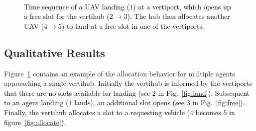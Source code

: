 \begin{figure}[h]
\centering
    ~
    ~
    \caption{\textcolor{black}{Time sequence of a UAV landing ($1$) at a vertiport, which opens up a free slot for the vertihub ($2\rightarrow3$). The hub then allocates another UAV ($4\rightarrow 5$) to land at a free slot in one of the vertiports.}}
    \label{fig:sequence}
\end{figure}

\subsection{Qualitative Results}

Figure~\ref{fig:sequence} contains an example of the allocation behavior for multiple agents approaching a single vertihub.
\textcolor{black}{Initially the vertihub is informed by the vertiports that there are no slots available for landing (see $2$ in Fig.~\ref{fig:land}). Subsequent to an agent landing ($1$ lands), an additional slot opens (see $3$ in Fig.~\ref{fig:free}).
Finally, the vertihub allocates a slot to a requesting vehicle ($4$ becomes $5$ in figure~\ref{fig:allocate}).} 

